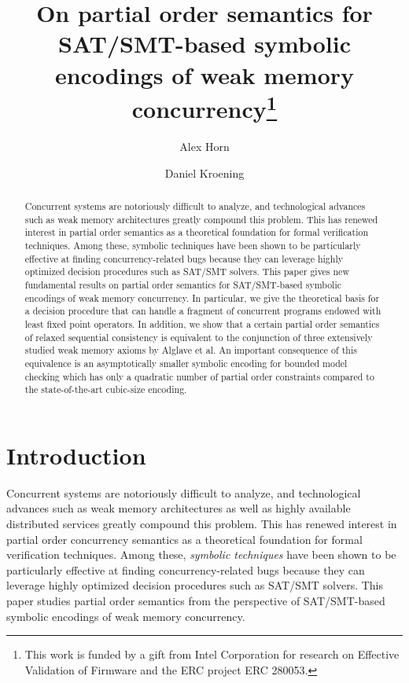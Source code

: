 \documentclass{llncs}
\title{On partial order semantics for SAT/SMT-based symbolic encodings of weak memory concurrency\thanks{This work is funded by a gift from Intel Corporation for research on Effective Validation of Firmware and the ERC project ERC 280053.}}
\author{Alex Horn \and Daniel Kroening}
\institute{University of Oxford}
\begin{document}
\maketitle
\begin{abstract}
Concurrent systems are notoriously difficult to analyze, and technological advances such as weak memory architectures greatly compound this problem.
This has renewed interest in partial order semantics as a theoretical foundation for formal verification techniques.
Among these, symbolic techniques have been shown to be particularly effective at finding concurrency-related bugs because they can leverage highly optimized decision procedures such as SAT/SMT solvers.
This paper gives new fundamental results on partial order semantics for SAT/SMT-based symbolic encodings of weak memory concurrency.
In particular, we give the theoretical basis for a decision procedure that can handle a fragment of concurrent programs endowed with least fixed point operators.
In addition, we show that a certain partial order semantics of relaxed sequential consistency is equivalent to the conjunction of three extensively studied weak memory axioms by Alglave et al.
An important consequence of this equivalence is an asymptotically smaller symbolic encoding for bounded model checking which has only a quadratic number of partial order constraints compared to the state-of-the-art cubic-size encoding.
\end{abstract}

\section{Introduction}
\vspace{-0.3em}
\label{section:introduction}

Concurrent systems are notoriously difficult to analyze, and technological advances such as weak memory architectures as well as highly available distributed services greatly compound this problem. This has renewed interest in partial order concurrency semantics as a theoretical foundation for formal verification techniques. Among these, \emph{symbolic techniques} have been shown to be particularly effective at finding concurrency-related bugs because they can leverage highly optimized decision procedures such as SAT/SMT solvers. This paper studies partial order semantics from the perspective of SAT/SMT-based symbolic encodings of weak memory concurrency.
\end{document}
